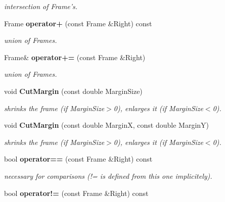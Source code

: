 \begin{CompactItemize}
\begin{CompactList}\small\item\em intersection of Frame's.\item\end{CompactList}\item 
{}
Frame {\bf operator+} (const Frame \&Right) const\label{class_frame_a11}

\begin{CompactList}\small\item\em union of Frames.\item\end{CompactList}\item 
{}
Frame\& {\bf operator+=} (const Frame \&Right)\label{class_frame_a12}

\begin{CompactList}\small\item\em union of Frames.\item\end{CompactList}\item 
{}
void {\bf Cut\-Margin} (const double Margin\-Size)\label{class_frame_a13}

\begin{CompactList}\small\item\em shrinks the frame (if Margin\-Size$>$0), enlarges it (if Margin\-Size$<$0).\item\end{CompactList}\item 
{}
void {\bf Cut\-Margin} (const double Margin\-X, const double Margin\-Y)\label{class_frame_a14}

\begin{CompactList}\small\item\em shrinks the frame (if Margin\-Size$>$0), enlarges it (if Margin\-Size$<$0).\item\end{CompactList}\item 
{}
bool {\bf operator==} (const Frame \&Right) const\label{class_frame_a15}

\begin{CompactList}\small\item\em necessary for comparisons (!= is defined from this one implicitely).\item\end{CompactList}\item 
{}
bool {\bf operator!=} (const Frame \&Right) const\label{class_frame_a16}


\end{CompactItemize}
